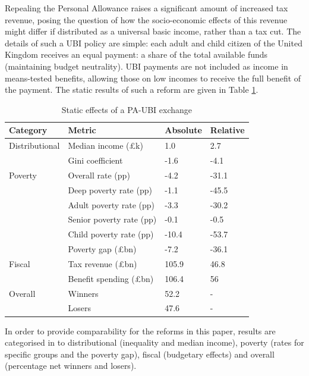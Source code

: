 \documentclass{article}
\begin{document}
    Repealing the Personal Allowance raises a significant amount of increased tax revenue, posing the question of how the socio-economic effects of this revenue might differ if distributed as a universal basic income, rather than a tax cut. The details of such a UBI policy are simple: each adult and child citizen of the United Kingdom receives an equal payment: a share of the total available funds (maintaining budget neutrality). UBI payments are not included as income in means-tested benefits, allowing those on low incomes to receive the full benefit of the payment. The static results of such a reform are given in Table \ref{tab:PA_UBI_results}.
    \begin{table}
        \centering
        \begin{tabular}{llll}
            \toprule
            Category & Metric & Absolute & Relative \\
            \midrule
            Distributional & Median income (£k) &        1.0 &      2.7 \\
                    & Gini coefficient &     -1.6 &     -4.1 \\
            Poverty & Overall rate (pp) &     -4.2 &    -31.1 \\
                    & Deep poverty rate (pp) &     -1.1 &    -45.5 \\
                    & Adult poverty rate (pp) &     -3.3 &    -30.2 \\
                    & Senior poverty rate (pp) &     -0.1 &     -0.5 \\
                    & Child poverty rate (pp) &    -10.4 &    -53.7 \\
                    & Poverty gap (£bn) &     -7.2 &    -36.1 \\
            Fiscal & Tax revenue (£bn) &    105.9 &     46.8 \\
                    & Benefit spending (£bn) &    106.4&       56 \\
            Overall & Winners &     52.2 &        - \\
                    & Losers &     47.6 &        - \\
            \bottomrule
        \end{tabular}
        \caption{Static effects of a PA-UBI exchange}
        \label{tab:PA_UBI_results}
    \end{table}
    
    In order to provide comparability for the reforms in this paper, results are categorised in to distributional (inequality and median income), poverty (rates for specific groups and the poverty gap), fiscal (budgetary effects) and overall (percentage net winners and losers). 
    
\end{document}
